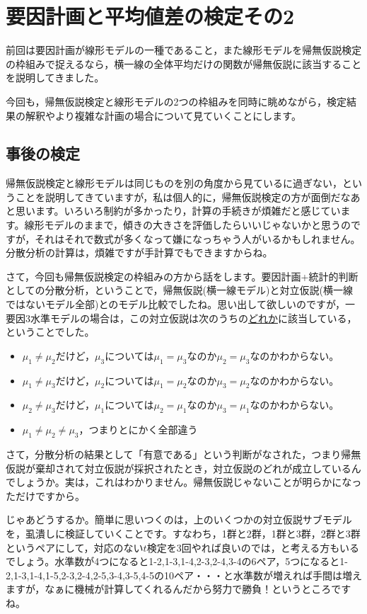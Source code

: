 \documentclass{ltjsarticle}
\begin{document}
\chapter{要因計画と平均値差の検定その2}
\label{chapter22}
前回は要因計画が線形モデルの一種であること，また線形モデルを帰無仮説検定の枠組みで捉えるなら，横一線の全体平均だけの関数が帰無仮説に該当することを説明してきました。

今回も，帰無仮説検定と線形モデルの2つの枠組みを同時に眺めながら，検定結果の解釈やより複雑な計画の場合について見ていくことにします。
\section{事後の検定}
帰無仮説検定と線形モデルは同じものを別の角度から見ているに過ぎない，ということを説明してきていますが，私は個人的に，帰無仮説検定の方が面倒だなあと思います。いろいろ制約が多かったり，計算の手続きが煩雑だと感じています。線形モデルのままで，傾きの大きさを評価したらいいじゃないかと思うのですが，それはそれで数式が多くなって嫌になっちゃう人がいるかもしれません。分散分析の計算は，煩雑ですが手計算でもできますからね。

さて，今回も帰無仮説検定の枠組みの方から話をします。要因計画+統計的判断としての分散分析，ということで，帰無仮説(横一線モデル)と対立仮説(横一線ではないモデル全部)とのモデル比較でしたね。思い出して欲しいのですが，一要因3水準モデルの場合は，この対立仮説は次のうちの\underline{どれか}に該当している，ということでした。
\begin{itemize}
	\item $\mu_1 \neq \mu_2$だけど，$\mu_3$については$\mu_1=\mu_3$なのか$\mu_2=\mu_3$なのかわからない。
	\item $\mu_1 \neq \mu_3$だけど，$\mu_2$については$\mu_1=\mu_2$なのか$\mu_3=\mu_2$なのかわからない。
	\item $\mu_2 \neq \mu_3$だけど，$\mu_1$については$\mu_2=\mu_1$なのか$\mu_3=\mu_1$なのかわからない。
	\item $\mu_1 \neq \mu_2 \neq \mu_3$，つまりとにかく全部違う
\end{itemize}
さて，分散分析の結果として「有意である」という判断がなされた，つまり帰無仮説が棄却されて対立仮説が採択されたとき，対立仮説のどれが成立しているんでしょうか。実は，これはわかりません。帰無仮説じゃないことが明らかになっただけですから。

じゃあどうするか。簡単に思いつくのは，上のいくつかの対立仮説サブモデルを，虱潰しに検証していくことです。すなわち，1群と2群，1群と3群，2群と3群というペアにして，対応のない$t$検定を3回やれば良いのでは，と考える方もいるでしょう。水準数が4つになると1-2,1-3,1-4,2-3,2-4,3-4の6ペア，5つになると1-2,1-3,1-4,1-5,2-3,2-4,2-5,3-4,3-5,4-5の10ペア・・・と水準数が増えれば手間は増えますが，なぁに機械が計算してくれるんだから努力で勝負！というところですね。
\end{document}
